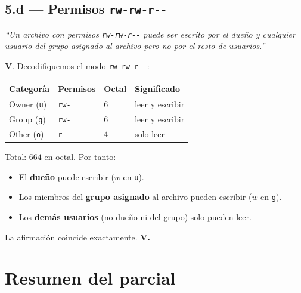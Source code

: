 \documentclass[11pt,a4paper]{article}
\begin{document}
\subsection*{5.d --- Permisos \texttt{rw-rw-r-{}-}}

\emph{``Un archivo con permisos \texttt{rw-rw-r-{}-} puede ser escrito
por el dueño y cualquier usuario del grupo asignado al archivo pero
no por el resto de usuarios.''}

\begin{respuesta}
\textbf{V}. Decodifiquemos el modo \texttt{rw-rw-r-{}-}:

\begin{center}
\small
\begin{tabular}{@{}llll@{}}
\toprule
Categoría & Permisos & Octal & Significado \\
\midrule
Owner (\texttt{u})  & \texttt{rw-} & $6$ & leer y escribir \\
Group (\texttt{g})  & \texttt{rw-} & $6$ & leer y escribir \\
Other (\texttt{o})  & \texttt{r-{}-} & $4$ & solo leer \\
\bottomrule
\end{tabular}
\end{center}

Total: $664$ en octal. Por tanto:

\begin{itemize}[leftmargin=*,nosep]
    \item El \textbf{dueño} puede escribir ($w$ en \texttt{u}).
    \item Los miembros del \textbf{grupo asignado} al archivo pueden
        escribir ($w$ en \texttt{g}).
    \item Los \textbf{demás usuarios} (no dueño ni del grupo) solo
        pueden leer.
\end{itemize}

La afirmación coincide exactamente. \textbf{V.}
\end{respuesta}

\section*{Resumen del parcial}
\end{document}
